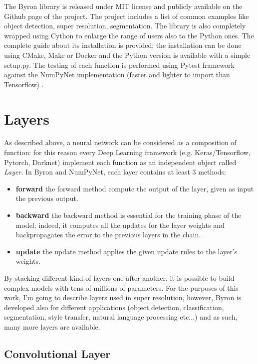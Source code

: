 \documentclass[12pt,a4paper]{report}
\begin{document}
The \textsf{Byron} library is released under \textsf{MIT} license and publicly available on the \textsf{Github} page of the project.
The project includes a list of common examples like object detection, super resolution, segmentation.
The library is also completely wrapped using \textsf{Cython} to enlarge the range of users also to the \textsf{Python} ones.
The complete guide about its installation is provided; the installation can be done using \textsf{CMake}, \textsf{Make} or \textsf{Docker} and the \textsf{Python} version is available with a simple \textsf{setup.py}.
The testing of each function is performed using \textsf{Pytest} framework against the \textsf{NumPyNet} implementation (faster and lighter to import than \textsf{Tensorflow}) \cite{nicotesi}.

\section{Layers}

As described above, a neural network can be considered as a composition of function: for this reason every Deep Learning framework (e.g. Keras/Tensorflow, Pytorch, Darknet) implement each function as an independent object called {\it Layer}. In Byron and NumPyNet, each layer contains at least 3 methods:
\begin{itemize}
 \setlength\itemsep{-0.3em}
 \item {\bf forward} the forward method compute the output of the layer, given as input the previous output. 
 \item {\bf backward} the backward method is essential for the training phase of the model: indeed, it computes all the updates for the layer weights and backpropagates the error to the previous layers in the chain.
 \item {\bf update} the update method applies the given update rules to the layer's weights.
\end{itemize}
By stacking different kind of layers one after another, it is possible to build 
complex models with tens of millions of parameters. 
For the purposes of this work, I'm going to describe layers used in super resolution, however, Byron is developed also for different applications (object detection, classification, segmentation, style transfer, natural language processing etc...) and as such, many more layers are available.   

\subsection*{Convolutional Layer}
\end{document}

